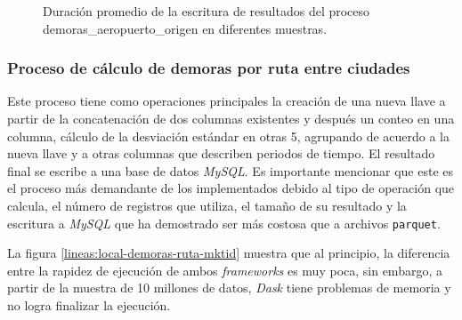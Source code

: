 \begin{figure}
\centering
{}
\caption{Duración promedio de la escritura de resultados del proceso demoras\_aeropuerto\_origen en diferentes muestras.}
\label{lineas:local-demoras-ruta-aeropuerto-write}
\end{figure}

\subsubsection{Proceso de cálculo de demoras por ruta entre ciudades}

Este proceso tiene como operaciones principales la creación de una nueva llave a partir de la concatenación de dos columnas existentes y después un conteo en una columna, cálculo de la desviación estándar en otras 5, agrupando de acuerdo a la nueva llave y a otras columnas que describen periodos de tiempo. El resultado final se escribe a una base de datos \textit{MySQL}. Es importante mencionar que este es el proceso más demandante de los implementados debido al tipo de operación que calcula, el número de registros que utiliza, el tamaño de su resultado y la escritura a \textit{MySQL} que ha demostrado ser más costosa que a archivos \texttt{parquet}.

La figura \ref{lineas:local-demoras-ruta-mktid} muestra que al principio, la diferencia entre la rapidez de ejecución de ambos \textit{frameworks} es muy poca, sin embargo, a partir de la muestra de 10 millones de datos, \textit{Dask} tiene problemas de memoria y no logra finalizar la ejecución.

